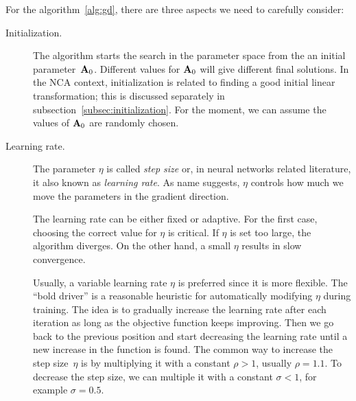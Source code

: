 	For the algorithm~\ref{alg:gd}, there are three aspects we need to carefully consider:
	\begin{description}
	 \item[Initialization.] The algorithm starts the search in the parameter space from the an initial parameter~$\mathbf{A}_0$. Different values for $\mathbf{A}_0$ will give different final solutions. In the NCA context, initialization is related to finding a good initial linear transformation; this is discussed  separately in subsection~\ref{subsec:initialization}. For the moment, we can assume the values of $\mathbf{A}_0$ are randomly chosen.
	 \item[Learning rate.] The parameter $\eta$ is called \textit{step size} or, in neural networks related literature, it also known as \textit{learning rate}. As name suggests, $\eta$ controls how much we move the parameters in the gradient direction. 

	The learning rate can be either fixed or adaptive. For the first case, choosing the correct value for $\eta$ is critical. If $\eta$ is set too large, the algorithm diverges. On the other hand, a small $\eta$ results in slow convergence. 

	Usually, a variable learning rate $\eta$ is preferred since it is more flexible. The ``bold driver'' \citep{vogl1988} is a reasonable heuristic for automatically modifying $\eta$ during training. The idea is to gradually increase the learning rate after each iteration as long as the objective function keeps improving. Then we go back to the previous position and start decreasing the learning rate until a new increase in the function is found. The common way to increase the step size~$\eta$ is by multiplying it with a constant $\rho>1$, usually $\rho=1.1$. To decrease the step size, we can multiple it with a constant $\sigma<1$, for example $\sigma = 0.5$.

	

\end{description}
